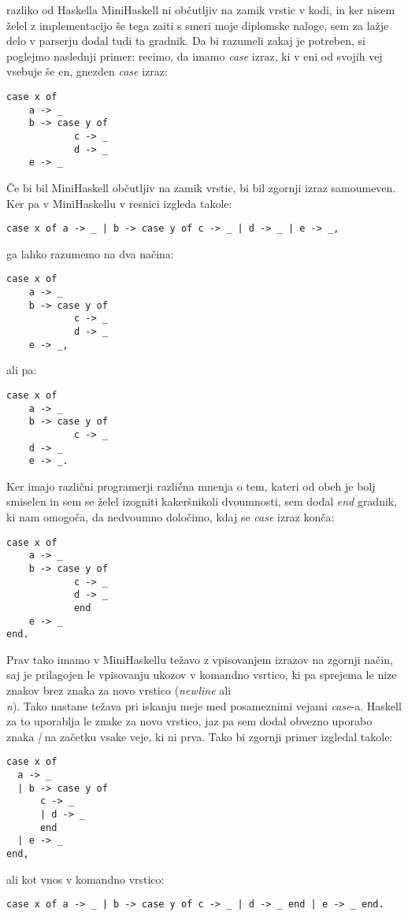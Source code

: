 \documentclass[12pt,a4paper,openany]{book}
\begin{document}
razliko od Haskella MiniHaskell ni občutljiv na zamik vrstic v kodi, in ker nisem želel z implementacijo še tega zaiti s smeri moje diplomske naloge, sem za lažje delo v parserju 
dodal tudi ta gradnik. Da bi razumeli zakaj je potreben, si poglejmo naslednji primer: recimo, da imamo \emph{case} izraz, ki v eni od svojih vej vsebuje še en, gnezden \emph{case} 
izraz:
\begin{lstlisting}
case x of 
    a -> _
    b -> case y of
            c -> _
            d -> _
    e -> _
\end{lstlisting}
Če bi bil MiniHaskell občutljiv na zamik vrstic, bi bil zgornji izraz samoumeven. Ker pa v MiniHaskellu v resnici izgleda takole:
\begin{lstlisting}
case x of a -> _ | b -> case y of c -> _ | d -> _ | e -> _,
\end{lstlisting}
ga lahko razumemo na dva načina:
\begin{lstlisting}
case x of 
    a -> _
    b -> case y of
            c -> _
            d -> _
    e -> _,
\end{lstlisting}
ali pa:
\begin{lstlisting}
case x of 
    a -> _
    b -> case y of
            c -> _
    d -> _
    e -> _.
\end{lstlisting}
Ker imajo različni programerji različna mnenja o tem, kateri od obeh je bolj smiselen in sem se želel izogniti kakeršnikoli dvoumnosti, sem dodal 
\emph{end} gradnik, ki nam omogoča, da nedvoumno določimo, kdaj se \emph{case} izraz konča:
\begin{lstlisting}
case x of 
    a -> _
    b -> case y of
            c -> _
            d -> _
            end
    e -> _
end.
\end{lstlisting}
Prav tako imamo v MiniHaskellu težavo z vpisovanjem izrazov na zgornji način, saj je prilagojen le vpisovanju ukozov v komandno vsrtico, ki pa 
sprejema le nize znakov brez znaka za novo vrstico (\emph{newline} ali \emph{\\n}). Tako nastane težava pri iskanju meje med posameznimi vejami
\emph{case}-a. Haskell za to uporablja le znake za novo vrstico, jaz pa sem dodal obvezno uporabo znaka \emph{|} na začetku vsake veje, ki ni prva.
Tako bi zgornji primer izgledal takole:
\begin{lstlisting}
case x of 
  a -> _
  | b -> case y of
      c -> _
      | d -> _
      end
  | e -> _
end,
\end{lstlisting}
ali kot vnos v komandno vrstico:
\begin{lstlisting}
case x of a -> _ | b -> case y of c -> _ | d -> _ end | e -> _ end.
\end{lstlisting}
\end{document}
